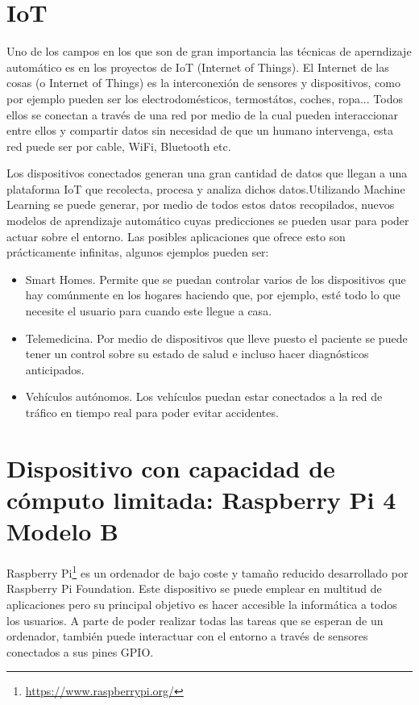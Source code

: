 \documentclass[a4paper, 12pt]{book}
\begin{document}
\section{IoT}
\label{sec:IoT}

Uno de los campos en los que son de gran importancia las técnicas de aperndizaje automático es en los proyectos de IoT (Internet of Things). El Internet de las cosas (o Internet of Things) es la interconexión de sensores y dispositivos, como por ejemplo pueden ser los electrodomésticos, termostátos, coches, ropa... Todos ellos se conectan a través de una red por medio de la cual pueden interaccionar entre ellos y compartir datos sin necesidad de que un humano intervenga, esta red puede ser por cable, WiFi, Bluetooth etc. 

Los dispositivos conectados generan una gran cantidad de datos que llegan a una plataforma IoT que recolecta, procesa y analiza dichos datos.Utilizando Machine Learning se puede generar, por medio de todos estos datos recopilados, nuevos modelos de aprendizaje automático cuyas predicciones se pueden usar para poder actuar sobre el entorno. Las posibles aplicaciones que ofrece esto son prácticamente infinitas, algunos ejemplos pueden ser:

\begin{itemize}
    \item Smart Homes. Permite que se puedan controlar varios de los dispositivos que hay comúnmente en los hogares haciendo que, por ejemplo, esté todo lo que necesite el usuario para cuando este llegue a casa.
    \item Telemedicina. Por medio de dispositivos que lleve puesto el paciente se puede tener un control sobre su estado de salud e incluso hacer diagnósticos anticipados.
    \item Vehículos autónomos. Los vehículos puedan estar conectados a la red de tráfico en tiempo real para poder evitar accidentes.
\end{itemize}

\section{Dispositivo con capacidad de cómputo limitada: Raspberry Pi 4 Modelo B}
\label{sec:dispositivo_hardware}

Raspberry Pi\footnote{\url{https://www.raspberrypi.org/}} es un ordenador de bajo coste y tamaño reducido desarrollado por Raspberry Pi Foundation. Este dispositivo se puede emplear en  multitud de aplicaciones pero su principal objetivo es hacer accesible la informática a todos los usuarios. A parte de poder realizar todas las tareas que se esperan de un ordenador, también puede interactuar con el entorno a través de sensores conectados a sus pines GPIO.
\end{document}
